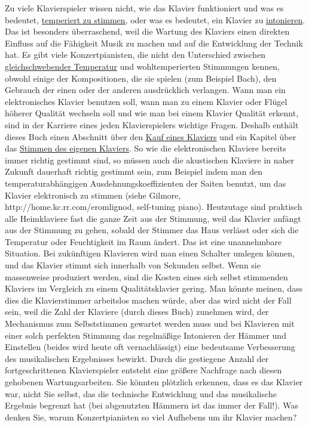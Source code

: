 Zu viele Klavierspieler wissen nicht, wie das Klavier funktioniert und was es bedeutet, \hyperref[c2_2c]{temperiert zu stimmen}, oder was es bedeutet, ein Klavier zu \hyperref[c2_7_hamm]{intonieren}.
Das ist besonders überraschend, weil die Wartung des Klaviers einen direkten Einfluss auf die Fähigkeit Musik zu machen und auf die Entwicklung der Technik hat.
Es gibt viele Konzertpianisten, die nicht den Unterschied zwischen \hyperref[et1]{gleichschwebender Temperatur} und wohltemperierten Stimmungen kennen, obwohl einige der Kompositionen, die sie spielen (zum Beispiel Bach), den Gebrauch der einen oder der anderen ausdrücklich verlangen.
Wann man ein elektronisches Klavier benutzen soll, wann man zu einem Klavier oder Flügel höherer Qualität wechseln soll und wie man bei einem Klavier Qualität erkennt, sind in der Karriere eines jeden Klavierspielers wichtige Fragen.
Deshalb enthält dieses Buch einen Abschnitt über den \hyperref[c1iii17e]{Kauf eines Klaviers} und ein Kapitel über das \hyperref[c2_1]{Stimmen des eigenen Klaviers}.
So wie die elektronischen Klaviere bereits immer richtig gestimmt sind, so müssen auch die akustischen Klaviere in naher Zukunft dauerhaft richtig gestimmt sein, zum Beispiel indem man den temperaturabhängigen Ausdehnungskoeffizienten der Saiten benutzt, um das Klavier elektronisch zu stimmen (siehe Gilmore, http://home.kc.rr.com/eromlignod, self-tuning piano).
Heutzutage sind praktisch alle Heimklaviere fast die ganze Zeit aus der Stimmung, weil das Klavier anfängt aus der Stimmung zu gehen, sobald der Stimmer das Haus verlässt oder sich die Temperatur oder Feuchtigkeit im Raum ändert.
Das ist eine unannehmbare Situation.
Bei zukünftigen Klavieren wird man einen Schalter umlegen können, und das Klavier stimmt sich innerhalb von Sekunden selbst.
Wenn sie massenweise produziert werden, sind die Kosten eines sich selbst stimmenden Klaviers im Vergleich zu einem Qualitätsklavier gering.
Man könnte meinen, dass dies die Klavierstimmer arbeitslos machen würde, aber das wird nicht der Fall sein, weil die Zahl der Klaviere (durch dieses Buch) zunehmen wird, der Mechanismus zum Selbststimmen gewartet werden muss und bei Klavieren mit einer solch perfekten Stimmung das regelmäßige Intonieren der Hämmer und Einstellen (beides wird heute oft vernachlässigt) eine bedeutsame Verbesserung des musikalischen Ergebnisses bewirkt.
Durch die gestiegene Anzahl der fortgeschrittenen Klavierspieler entsteht eine größere Nachfrage nach diesen gehobenen Wartungsarbeiten.
Sie könnten plötzlich erkennen, dass es das Klavier war, nicht Sie selbst, das die technische Entwicklung und das musikalische Ergebnis begrenzt hat (bei abgenutzten Hämmern ist das immer der Fall!).
Was denken Sie, warum Konzertpianisten so viel Aufhebens um ihr Klavier machen?

